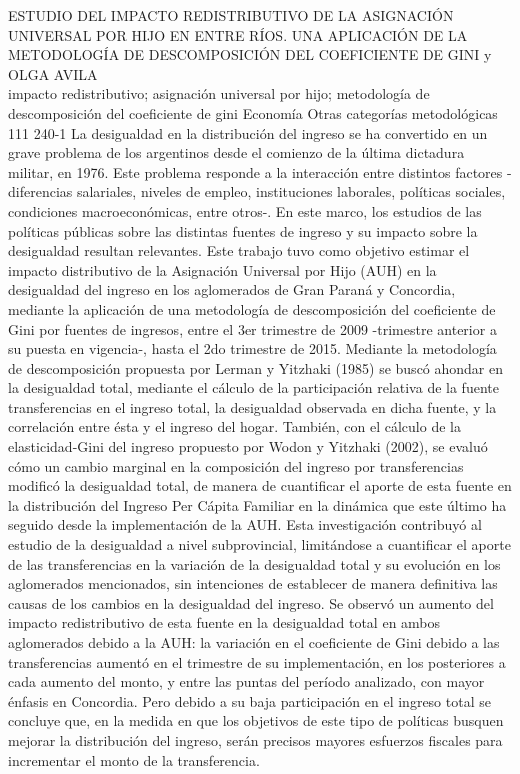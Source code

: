\A
{ESTUDIO DEL IMPACTO REDISTRIBUTIVO DE LA ASIGNACIÓN UNIVERSAL POR HIJO EN ENTRE RÍOS. UNA APLICACIÓN DE LA METODOLOGÍA DE DESCOMPOSICIÓN DEL COEFICIENTE DE GINI}
{ y OLGA AVILA}
{
\\}
{impacto redistributivo; asignación universal por hijo; metodología de descomposición del coeficiente de gini} 
 {Economía} 
 {Otras categorías metodológicas} 
 {111} 
 {240-1}
{La desigualdad en la distribución del ingreso se ha convertido en un grave problema de los argentinos desde el comienzo de la última dictadura militar, en 1976. Este problema responde a la interacción entre distintos factores -diferencias salariales, niveles de empleo, instituciones laborales, políticas sociales, condiciones macroeconómicas, entre otros-. En este marco, los estudios de las políticas públicas sobre las distintas fuentes de ingreso y su impacto sobre la desigualdad resultan relevantes. Este trabajo tuvo como objetivo estimar el impacto distributivo de la Asignación Universal por Hijo (AUH) en la desigualdad del ingreso en los aglomerados de Gran Paraná y Concordia, mediante la aplicación de una metodología de descomposición del coeficiente de Gini por fuentes de ingresos, entre el 3er trimestre de 2009 -trimestre anterior a su puesta en vigencia-, hasta el 2do trimestre de 2015. Mediante la metodología de descomposición propuesta por Lerman y Yitzhaki (1985) se buscó ahondar en la desigualdad total, mediante el cálculo de la participación relativa de la fuente transferencias en el ingreso total, la desigualdad observada en dicha fuente, y la correlación entre ésta y el ingreso del hogar. También, con el cálculo de la elasticidad-Gini del ingreso propuesto por Wodon y Yitzhaki (2002), se evaluó cómo un cambio marginal en la composición del ingreso por transferencias modificó la desigualdad total, de manera de cuantificar el aporte de esta fuente en la distribución del Ingreso Per Cápita Familiar en la dinámica que este último ha seguido desde la implementación de la AUH. Esta investigación contribuyó al estudio de la desigualdad a nivel subprovincial, limitándose a cuantificar el aporte de las transferencias en la variación de la desigualdad total y su evolución en los aglomerados mencionados, sin intenciones de establecer de manera definitiva las causas de los cambios en la desigualdad del ingreso. Se observó un aumento del impacto redistributivo de esta fuente en la desigualdad total en ambos aglomerados debido a la AUH: la variación en el coeficiente de Gini debido a las transferencias aumentó en el trimestre de su implementación, en los posteriores a cada aumento del monto, y entre las puntas del período analizado, con mayor énfasis en Concordia. Pero debido a su baja participación en el ingreso total se concluye que, en la medida en que los objetivos de este tipo de políticas busquen mejorar la distribución del ingreso, serán precisos mayores esfuerzos fiscales para incrementar el monto de la transferencia.}
